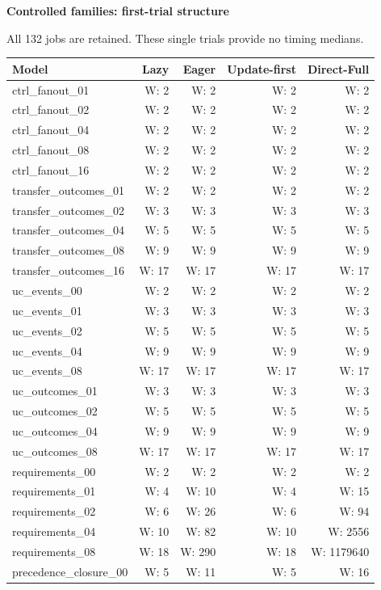 \clearpage\noindent\textbf{Controlled families: first-trial structure}\par
All 132 jobs are retained. These single trials provide no timing medians.
\begin{longtable}{@{}lrrrr@{}}
\toprule
Model & Lazy & Eager & Update-first & Direct-Full\\\midrule\endhead
ctrl\_fanout\_01 & W: 2 & W: 2 & W: 2 & W: 2\\
ctrl\_fanout\_02 & W: 2 & W: 2 & W: 2 & W: 2\\
ctrl\_fanout\_04 & W: 2 & W: 2 & W: 2 & W: 2\\
ctrl\_fanout\_08 & W: 2 & W: 2 & W: 2 & W: 2\\
ctrl\_fanout\_16 & W: 2 & W: 2 & W: 2 & W: 2\\
transfer\_outcomes\_01 & W: 2 & W: 2 & W: 2 & W: 2\\
transfer\_outcomes\_02 & W: 3 & W: 3 & W: 3 & W: 3\\
transfer\_outcomes\_04 & W: 5 & W: 5 & W: 5 & W: 5\\
transfer\_outcomes\_08 & W: 9 & W: 9 & W: 9 & W: 9\\
transfer\_outcomes\_16 & W: 17 & W: 17 & W: 17 & W: 17\\
uc\_events\_00 & W: 2 & W: 2 & W: 2 & W: 2\\
uc\_events\_01 & W: 3 & W: 3 & W: 3 & W: 3\\
uc\_events\_02 & W: 5 & W: 5 & W: 5 & W: 5\\
uc\_events\_04 & W: 9 & W: 9 & W: 9 & W: 9\\
uc\_events\_08 & W: 17 & W: 17 & W: 17 & W: 17\\
uc\_outcomes\_01 & W: 3 & W: 3 & W: 3 & W: 3\\
uc\_outcomes\_02 & W: 5 & W: 5 & W: 5 & W: 5\\
uc\_outcomes\_04 & W: 9 & W: 9 & W: 9 & W: 9\\
uc\_outcomes\_08 & W: 17 & W: 17 & W: 17 & W: 17\\
requirements\_00 & W: 2 & W: 2 & W: 2 & W: 2\\
requirements\_01 & W: 4 & W: 10 & W: 4 & W: 15\\
requirements\_02 & W: 6 & W: 26 & W: 6 & W: 94\\
requirements\_04 & W: 10 & W: 82 & W: 10 & W: 2556\\
requirements\_08 & W: 18 & W: 290 & W: 18 & W: 1179640\\
precedence\_closure\_00 & W: 5 & W: 11 & W: 5 & W: 16\\

\end{longtable}
